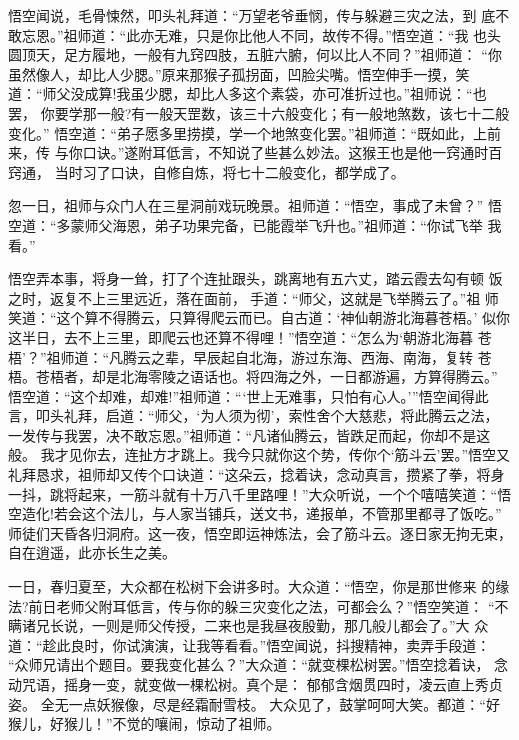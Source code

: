 悟空闻说，毛骨悚然，叩头礼拜道：“万望老爷垂悯，传与躲避三灾之法，到
底不敢忘恩。”祖师道：“此亦无难，只是你比他人不同，故传不得。”悟空道：“我
也头圆顶天，足方履地，一般有九窍四肢，五脏六腑，何以比人不同？”祖师道：
“你虽然像人，却比人少腮。”原来那猴子孤拐面，凹脸尖嘴。悟空伸手一摸，笑
道：“师父没成算!我虽少腮，却比人多这个素袋，亦可准折过也。”祖师说：“也罢，
你要学那一般?有一般天罡数，该三十六般变化；有一般地煞数，该七十二般变化。”
悟空道：“弟子愿多里捞摸，学一个地煞变化罢。”祖师道：“既如此，上前来，传
与你口诀。”遂附耳低言，不知说了些甚么妙法。这猴王也是他一窍通时百窍通，
当时习了口诀，自修自炼，将七十二般变化，都学成了。

忽一日，祖师与众门人在三星洞前戏玩晚景。祖师道：“悟空，事成了未曾？”
悟空道：“多蒙师父海恩，弟子功果完备，已能霞举飞升也。”祖师道：“你试飞举
我看。”

悟空弄本事，将身一耸，打了个连扯跟头，跳离地有五六丈，踏云霞去勾有顿
饭之时，返复不上三里远近，落在面前，手道：“师父，这就是飞举腾云了。”祖
师笑道：“这个算不得腾云，只算得爬云而已。自古道：‘神仙朝游北海暮苍梧。’
似你这半日，去不上三里，即爬云也还算不得哩！”悟空道：“怎么为‘朝游北海暮
苍梧’？”祖师道：“凡腾云之辈，早辰起自北海，游过东海、西海、南海，复转
苍梧。苍梧者，却是北海零陵之语话也。将四海之外，一日都游遍，方算得腾云。”
悟空道：“这个却难，却难!”祖师道：“‘世上无难事，只怕有心人。’”悟空闻得此
言，叩头礼拜，启道：“师父，‘为人须为彻’，索性舍个大慈悲，将此腾云之法，
一发传与我罢，决不敢忘恩。”祖师道：“凡诸仙腾云，皆跌足而起，你却不是这般。
我才见你去，连扯方才跳上。我今只就你这个势，传你个‘筋斗云’罢。”悟空又
礼拜恳求，祖师却又传个口诀道：“这朵云，捻着诀，念动真言，攒紧了拳，将身
一抖，跳将起来，一筋斗就有十万八千里路哩！”大众听说，一个个嘻嘻笑道：“悟
空造化!若会这个法儿，与人家当铺兵，送文书，递报单，不管那里都寻了饭吃。”
师徒们天昏各归洞府。这一夜，悟空即运神炼法，会了筋斗云。逐日家无拘无束，
自在逍遥，此亦长生之美。

一日，春归夏至，大众都在松树下会讲多时。大众道：“悟空，你是那世修来
的缘法?前日老师父附耳低言，传与你的躲三灾变化之法，可都会么？”悟空笑道：
“不瞒诸兄长说，一则是师父传授，二来也是我昼夜殷勤，那几般儿都会了。”大
众道：“趁此良时，你试演演，让我等看看。”悟空闻说，抖搜精神，卖弄手段道：
“众师兄请出个题目。要我变化甚么？”大众道：“就变棵松树罢。”悟空捻着诀，
念动咒语，摇身一变，就变做一棵松树。真个是：
郁郁含烟贯四时，凌云直上秀贞姿。
全无一点妖猴像，尽是经霜耐雪枝。
大众见了，鼓掌呵呵大笑。都道：“好猴儿，好猴儿！”不觉的嚷闹，惊动了祖师。

